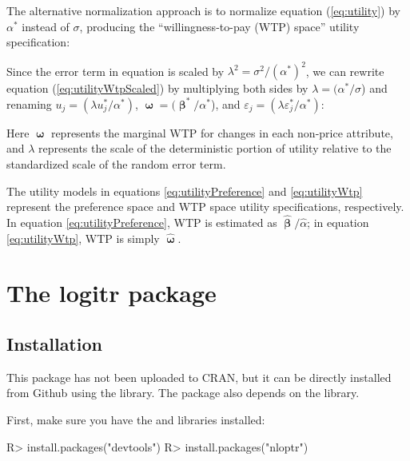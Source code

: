 \documentclass[article]{jss}
\begin{document}
The alternative normalization approach is to normalize equation
(\ref{eq:utility}) by \(\alpha^*\) instead of \(\sigma\), producing the
``willingness-to-pay (WTP) space'' utility specification:



Since the error term in equation is scaled by
\(\lambda^2 = \sigma^2/(\alpha^{*})^2\), we can rewrite equation
(\ref{eq:utilityWtpScaled}) by multiplying both sides by
\(\lambda= (\alpha^{*} / \sigma\)) and renaming
\(u_j = (\lambda u^*_j / \alpha^*)\),
\(\boldsymbol\upomega= (\boldsymbol\upbeta^{*} / \alpha^{*}\)), and
\(\varepsilon_j = (\lambda \varepsilon^*_j / \alpha^*)\):



Here \(\boldsymbol\upomega\) represents the marginal WTP for changes in
each non-price attribute, and \(\lambda\) represents the scale of the
deterministic portion of utility relative to the standardized scale of
the random error term.

The utility models in equations \ref{eq:utilityPreference} and
\ref{eq:utilityWtp} represent the preference space and WTP space utility
specifications, respectively. In equation \ref{eq:utilityPreference},
WTP is estimated as \(\hat{\boldsymbol\upbeta} / \hat{\alpha}\); in
equation \ref{eq:utilityWtp}, WTP is simply
\(\hat{\boldsymbol\upomega}\).

\hypertarget{the-logitr-package}{%
\section{The logitr package}\label{the-logitr-package}}

\hypertarget{installation}{%
\subsection{Installation}\label{installation}}

This package has not been uploaded to CRAN, but it can be directly
installed from Github using the  library. The package also
depends on the  library.

First, make sure you have the  and  libraries
installed:

\begin{CodeChunk}

\begin{CodeInput}
R> install.packages("devtools")
R> install.packages("nloptr")
\end{CodeInput}
\end{CodeChunk}
\end{document}
